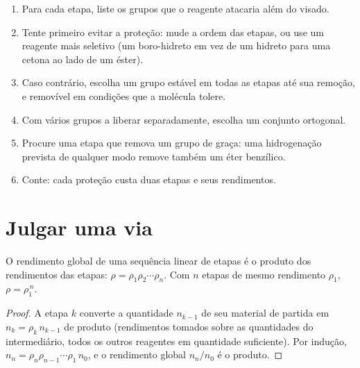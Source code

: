 \begin{method}\label{met:b2:retrosynthesis:protect-in-route}
\begin{enumerate}
  \item Para cada etapa, liste os grupos que o reagente atacaria além do visado.
  \item Tente primeiro evitar a proteção: mude a ordem das etapas, ou use um reagente mais seletivo
        (um boro-hidreto em vez de um hidreto para uma cetona ao lado de um éster).
  \item Caso contrário, escolha um grupo estável em todas as etapas até sua remoção, e removível em
        condições que a molécula tolere.
  \item Com vários grupos a liberar separadamente, escolha um conjunto ortogonal.
  \item Procure uma etapa que remova um grupo de graça: uma hidrogenação prevista de qualquer modo
        remove também um éter benzílico.
  \item Conte: cada proteção custa duas etapas e seus rendimentos.
\end{enumerate}
\end{method}

\section{Julgar uma via}\label{sec:b2:retrosynthesis:judging}

\begin{proposition}\label{prop:b2:retrosynthesis:overall-yield}
O rendimento global de uma sequência linear de etapas é o produto dos rendimentos das etapas:
$\rho = \rho_1 \rho_2 \cdots \rho_n$. Com $n$ etapas de mesmo rendimento $\rho_1$, $\rho = \rho_1^{\,n}$.
\end{proposition}

\begin{proof}
A etapa $k$ converte a quantidade $n_{k-1}$ de seu material de partida em $n_k = \rho_k\, n_{k-1}$ de produto
(rendimentos tomados sobre as quantidades do intermediário, todos os outros reagentes em quantidade
suficiente). Por indução,
$n_n = \rho_n \rho_{n-1} \cdots \rho_1\, n_0$, e o rendimento global $n_n/n_0$ é o produto.
\end{proof}

